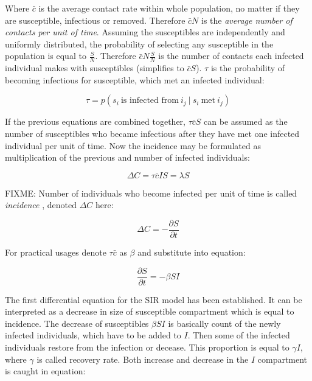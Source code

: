 \documentclass[
  digital, %
  table,   %
  twoside, %
  12pt,
  lof,     %
  lot,     %
]{fithesis3}
\begin{document}
Where $\bar{c}$ is the average contact rate within whole 
population, no matter if they are susceptible, infectious 
or removed. Therefore $\bar{c}N$ is the \textit{average number 
of contacts per unit of time}.
Assuming the susceptibles are independently and uniformly 
distributed, the probability of selecting any susceptible 
in the population is equal to $\frac{S}{N}$.
Therefore $\bar{c}N\frac{S}{N}$ is the number of contacts 
each infected individual makes with susceptibles 
(simplifies to $\bar{c}S$).
$\tau$ is the probability of becoming infectious for 
susceptible, which met an infected individual:

\begin{equation}
	\tau = p \left( s_i~\textrm{is infected from}~i_j~|~s_i~\textrm{met}~i_j \right)
\end{equation}

If the previous equations are combined together, 
$\tau \bar{c} S$ can be assumed as the number of 
susceptibles who became infectious after they have 
met one infected individual per unit of time.
Now the incidence may be formulated as multiplication 
of the previous and number of infected individuals:

\begin{equation}
	\Delta C = \tau \bar{c} I S = \lambda S
\end{equation}

FIXME: Number of individuals who become infected per unit of 
time is called \textit{incidence} \cite{martcheva2015}, denoted $\Delta C$ here:

\begin{equation}
	\Delta C = -\frac{\partial{S}}{\partial{t}}
\end{equation}

For practical usages denote $\tau \bar{c}$ as $\beta$ 
and substitute into equation:

\begin{equation}
	\frac{\partial{S}}{\partial{t}} = -\beta S I
\end{equation}

The first differential equation for the SIR model has 
been established. It can be interpreted as a decrease 
in size of susceptible compartment which is equal 
to incidence.
The decrease of susceptibles $\beta S I$ is basically 
count of the newly infected individuals, which have 
to be added to $I$. 
Then some of the infected individuals restore from 
the infection or decease. 
This proportion is equal to $\gamma I$, where $\gamma$ 
is called recovery rate. Both increase and decrease in 
the $I$ compartment is caught in equation:
\end{document}

